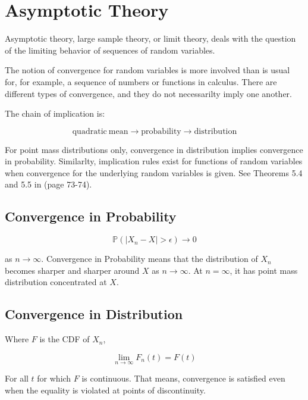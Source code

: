 \section{Asymptotic Theory}

Asymptotic theory, large sample theory, or limit theory, deals with the question of the limiting behavior of sequences of random variables. 

The notion of convergence for random variables is more involved than is usual for, for example, a sequence of numbers or functions in calculus. There are different types of convergence, and they do not necessarilty imply one another.

The chain of implication is:

\begin{equation}
\mathrm{quadratic\ mean} \rightarrow \mathrm{probability} \rightarrow \mathrm{distribution}
\end{equation}

For point mass distributions only, convergence in distribution implies convergence in probability. Similarlty, implication rules exist for functions of random variables when convergence for the underlying random variables is given. See Theorems 5.4 and 5.5 in  (page 73-74). 

\subsection{Convergence in Probability}

\begin{equation}
\mathbb{P}(|X_n - X| > \epsilon) \rightarrow 0
\end{equation}

as $n\rightarrow \infty$. Convergence in Probability means that the distribution of $X_n$ becomes sharper and sharper around $X$ as $n\rightarrow \infty$. At $n=\infty$, it has point mass distribution concentrated at $X$.

\subsection{Convergence in Distribution}
Where $F$ is the CDF of $X_n$,

\begin{equation}
\lim_{n\rightarrow \infty} F_n(t) = F(t)
\end{equation}

For all $t$ for which $F$ is continuous. That means, convergence is satisfied even when the equality is violated at points of discontinuity.

